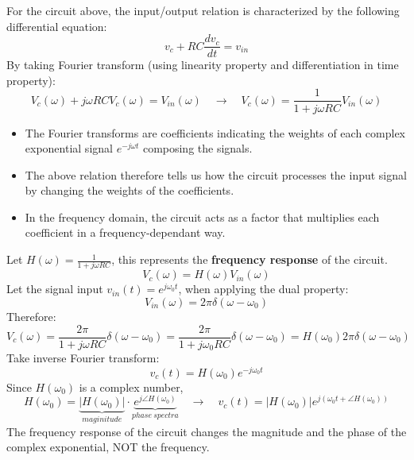 \begin{ex}{}
\begin{figure}[H] 
    \centering
\end{figure}

For the circuit above, the input/output relation is characterized by the following differential equation:
\[ 
v_{c}+RC \frac{d v_{c}}{dt} = v_{in} 
\]
By taking Fourier transform (using linearity property and differentiation in time property):
\[ 
V_{c}(\omega) + j\omega RC V_{c}(\omega) = V_{in}(\omega) \quad \to \quad V_{c}(\omega) = \frac{1}{1+j\omega RC}V_{in}(\omega) 
\]

\begin{itemize}
    \item The Fourier transforms are coefficients indicating the weights of each complex exponential signal $e^{-j \omega t}$ composing the signals. 
    
    \item The above relation therefore tells us how the circuit processes the input signal by changing the weights of the coefficients. 
    
    \item In the frequency domain, the circuit acts as a factor that multiplies each coefficient in a frequency-dependant way.
\end{itemize}

Let $H(\omega) = \frac{1}{1+j\omega RC}$, this represents the \textbf{frequency response} of the circuit.
\[ 
V_{c}(\omega) =H(\omega) V_{in}(\omega) 
\]
Let the signal input $v_{in}(t)=e^{j\omega_{0}t}$, when applying the dual property:
\[ 
V_{in}(\omega) = 2\pi \delta(\omega-\omega_{0}) 
\]
Therefore:
\[ 
V_{c}(\omega) 
= \frac{2 \pi}{1+j\omega RC}\delta(\omega-\omega_{0}) 
= \frac{2 \pi}{1+j\omega_{0} RC}\delta(\omega-\omega_{0}) 
= H(\omega_{0}) 2\pi\delta(\omega-\omega_{0}) 
\]
Take inverse Fourier transform:
\[ 
v_{c}(t) = H(\omega_{0})e^{-j\omega_{0} t} 
\]
Since $H(\omega_{0})$ is a complex number, 
\[ 
H(\omega_{0}) 
=\underbrace{\lvert H(\omega_{0}) \rvert}_{maginitude}\cdot \underbrace{e^{j \angle H(\omega_{0})}}_{phase \ spectra} 
\quad \to \quad  \boxed{v_{c}(t) 
= \lvert H(\omega_{0}) \rvert  e^{j(\omega_{0} t+ \angle H(\omega_{0}))}}
\]
The frequency response of the circuit changes the magnitude and the phase of the complex exponential, NOT the frequency.


\end{ex}
